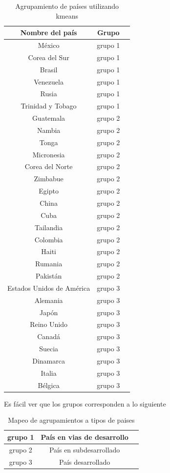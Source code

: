 \documentclass{article}
\begin{document}
\begin{table}[h]
\centering
\begin{tabular}{c|c|c}
 Nombre del país & Grupo \\
\hline
México & grupo 1\\
Corea del Sur & grupo 1\\
Brasil & grupo 1\\
Venezuela & grupo 1\\
Rusia & grupo 1\\
Trinidad y Tobago & grupo 1\\
Guatemala & grupo 2\\
Nambia & grupo 2\\
Tonga & grupo 2\\
Micronesia & grupo 2\\
Corea del Norte & grupo 2\\
Zimbabue & grupo 2\\
Egipto & grupo 2\\
China & grupo 2\\
Cuba & grupo 2\\
Tailandia & grupo 2\\
Colombia & grupo 2\\
Haiti & grupo 2\\
Rumania & grupo 2\\
Pakistán & grupo 2\\
Estados Unidos de América & grupo 3\\
Alemania & grupo 3\\
Japón & grupo 3\\
Reino Unido & grupo 3\\
Canadá & grupo 3\\
Suecia & grupo 3\\
Dinamarca & grupo 3\\
Italia & grupo 3\\
Bélgica & grupo 3 \\
\end{tabular}
\caption{Agrupamiento de países utilizando kmeans}
\label{tab:my_label}
\end{table}
Es fácil ver que los grupos corresponden a lo siguiente
\begin{table}[h]
\centering
\begin{tabular}{c|c|c}
 grupo 1 & País en vias de desarrollo \\
\hline
 grupo 2 & País en subdesarrollado \\
\hline
 grupo 3 & País desarrollado \\
\hline

\end{tabular}
\caption{Mapeo de agrupamientos a tipos de paises}
\label{tab:my_label}
\end{table}
\end{document}
